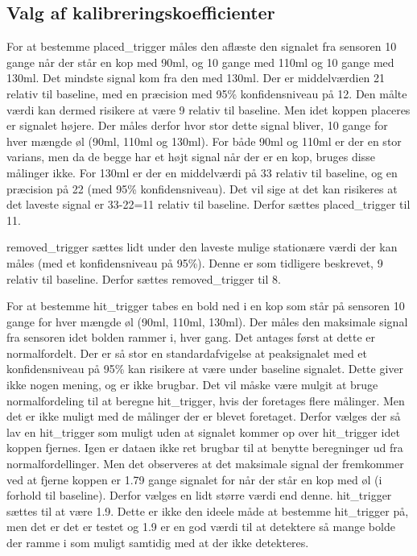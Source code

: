 \documentclass[Softwaredesign/Softwaredesign_main.tex]{subfiles}
\begin{document}
\subsection{Valg af kalibreringskoefficienter}
For at bestemme placed_trigger måles den aflæste den signalet fra sensoren 10 gange når der står en kop med 90ml, og 10 gange med 110ml og 10 gange med 130ml.
Det mindste signal kom fra den med 130ml.
Der er middelværdien 21 relativ til baseline, med en præcision med 95\% konfidensniveau på 12. Den målte værdi kan dermed risikere at være 9 relativ til baseline. Men idet koppen placeres er signalet højere. Der måles derfor hvor stor dette signal bliver, 10 gange for hver mængde øl (90ml, 110ml og 130ml). For både 90ml og 110ml er der en stor varians, men da de begge har et højt signal når der er en kop, bruges disse målinger ikke. For 130ml er der en middelværdi på 33 relativ til baseline, og en præcision på 22 (med 95\% konfidensniveau). Det vil sige at det kan risikeres at det laveste signal er 33-22=11 relativ til baseline. Derfor sættes placed_trigger til 11. 

removed_trigger sættes lidt under den laveste mulige stationære værdi der kan måles (med et konfidensniveau på 95\%). Denne er som tidligere beskrevet, 9 relativ til baseline. Derfor sættes removed_trigger til 8.

For at bestemme hit_trigger tabes en bold ned i en kop som står på sensoren 10 gange for hver mængde øl (90ml, 110ml, 130ml). Der måles den maksimale signal fra sensoren idet bolden rammer i, hver gang. Det antages først at dette er normalfordelt. Der er så stor en standardafvigelse at peaksignalet med et konfidensniveau på 95\% kan risikere at være under baseline signalet. Dette giver ikke nogen mening, og er ikke brugbar. Det vil måske være mulgit at bruge normalfordeling til at beregne hit_trigger, hvis der foretages flere målinger. Men det er ikke muligt med de målinger der er blevet foretaget. Derfor vælges der så lav en hit_trigger som muligt uden at signalet kommer op over hit_trigger idet koppen fjernes. Igen er dataen ikke ret brugbar til at benytte beregninger ud fra normalfordellinger. Men det observeres at det maksimale signal der fremkommer ved at fjerne koppen er 1.79 gange signalet for når der står en kop med øl (i forhold til baseline).
Derfor vælges en lidt større værdi end denne. hit_trigger sættes til at være 1.9. Dette er ikke den ideele måde at bestemme hit_trigger på, men det er det er testet og 1.9 er en god værdi til at detektere så mange bolde der ramme i som muligt samtidig med at der ikke detekteres.
\end{document}
